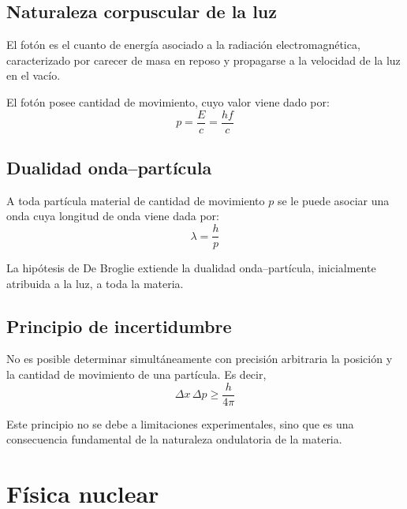 \documentclass[10pt]{article}
\begin{document}
\subsection{Naturaleza corpuscular de la luz}

\begin{definition}[Fotón]
  El fotón es el cuanto de energía asociado a la radiación electromagnética, caracterizado por carecer de masa en reposo y propagarse a la velocidad de la luz en el vacío.
\end{definition}

\begin{remark}
  El fotón posee cantidad de movimiento, cuyo valor viene dado por:
  \[ p = \frac{E}{c} = \frac{hf}{c} \]
\end{remark}

\subsection{Dualidad onda--partícula}

\begin{definition}
  A toda partícula material de cantidad de movimiento $p$ se le puede asociar una onda cuya longitud de onda viene dada por:
  \[ \lambda = \frac{h}{p} \]
\end{definition}

\begin{remark}
  La hipótesis de De Broglie extiende la dualidad onda--partícula, inicialmente atribuida a la luz, a toda la materia.
\end{remark}

\subsection{Principio de incertidumbre}

\begin{theorem}
  No es posible determinar simultáneamente con precisión arbitraria la posición y la cantidad de movimiento de una partícula. Es decir,
  \[ \Delta x\, \Delta p \geq \frac{h}{4\pi} \]
\end{theorem}

\begin{remark}
  Este principio no se debe a limitaciones experimentales, sino que es una consecuencia fundamental de la naturaleza ondulatoria de la materia.
\end{remark}

\section{Física nuclear}
\end{document}

